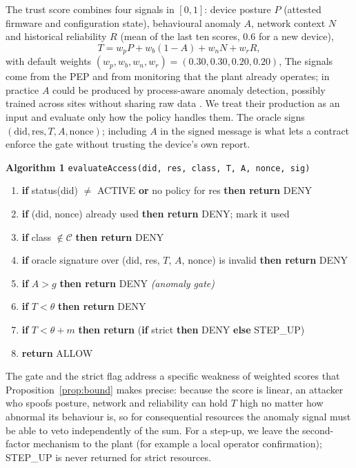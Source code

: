 The trust score combines four signals in $[0,1]$: device posture $P$ (attested firmware and configuration state), behavioural anomaly $A$, network context $N$ and historical reliability $R$ (mean of the last ten scores, 0.6 for a new device),
\begin{equation}
T=w_pP+w_b(1-A)+w_nN+w_rR,\label{eq:score}
\end{equation}
with default weights $(w_p,w_b,w_n,w_r)=(0.30,0.30,0.20,0.20)$,
\label{sec:signals}The signals come from the PEP and from monitoring that the plant already operates; in practice $A$ could be produced by process-aware anomaly detection, possibly trained across sites without sharing raw data \cite{tom2025flcti}. We treat their production as an input and evaluate only how the policy handles them. The oracle signs $(\mathrm{did},\mathrm{res},T,A,\mathrm{nonce})$; including $A$ in the signed message is what lets a contract enforce the gate without trusting the device's own report.

\begin{center}
\begin{minipage}{\linewidth}
\small
\textbf{Algorithm 1} \texttt{evaluateAccess(did, res, class, T, A, nonce, sig)}
\begin{enumerate}[leftmargin=1.4em,itemsep=0pt,topsep=2pt]
  \item \textbf{if} status(did) $\ne$ ACTIVE \textbf{or} no policy for res \textbf{then return} DENY
  \item \textbf{if} (did, nonce) already used \textbf{then return} DENY; mark it used
  \item \textbf{if} class $\notin\mathcal{C}$ \textbf{then return} DENY
  \item \textbf{if} oracle signature over (did, res, $T$, $A$, nonce) is invalid \textbf{then return} DENY
  \item \textbf{if} $A>g$ \textbf{then return} DENY \hfill\textit{(anomaly gate)}
  \item \textbf{if} $T<\theta$ \textbf{then return} DENY
  \item \textbf{if} $T<\theta+m$ \textbf{then return} (\textbf{if} strict \textbf{then} DENY \textbf{else} STEP\_UP)
  \item \textbf{return} ALLOW
\end{enumerate}
\end{minipage}
\end{center}

The gate and the strict flag address a specific weakness of weighted scores that Proposition~\ref{prop:bound} makes precise: because the score is linear, an attacker who spoofs posture, network and reliability can hold $T$ high no matter how abnormal its behaviour is, so for consequential resources the anomaly signal must be able to veto independently of the sum. For a step-up, we leave the second-factor mechanism to the plant (for example a local operator confirmation); STEP\_UP is never returned for strict resources.

